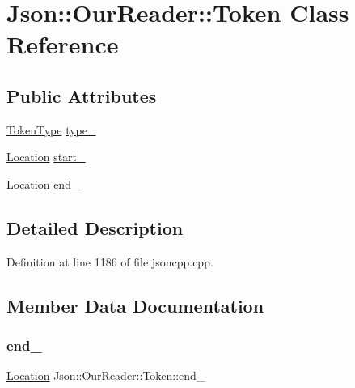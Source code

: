 \hypertarget{class_json_1_1_our_reader_1_1_token}{}\section{Json\+:\+:Our\+Reader\+:\+:Token Class Reference}
\label{class_json_1_1_our_reader_1_1_token}
\subsection*{Public Attributes}
\begin{DoxyCompactItemize}
\item 
\hyperlink{class_json_1_1_our_reader_a15116f7276ddf1e7a2cc3cbefa884dcc}{Token\+Type} \hyperlink{class_json_1_1_our_reader_1_1_token_abe7d858530396fa7e1293f7a579880ed}{type\+\_\+}
\item 
\hyperlink{class_json_1_1_our_reader_a1bdc7bbc52ba87cae6b19746f2ee0189}{Location} \hyperlink{class_json_1_1_our_reader_1_1_token_aedf68bb00eaaa9d3c22b9825999602ac}{start\+\_\+}
\item 
\hyperlink{class_json_1_1_our_reader_a1bdc7bbc52ba87cae6b19746f2ee0189}{Location} \hyperlink{class_json_1_1_our_reader_1_1_token_a67d2071638add857528579ae3791eccc}{end\+\_\+}
\end{DoxyCompactItemize}


\subsection{Detailed Description}


Definition at line 1186 of file jsoncpp.\+cpp.



\subsection{Member Data Documentation}
\hypertarget{class_json_1_1_our_reader_1_1_token_a67d2071638add857528579ae3791eccc}{}\label{class_json_1_1_our_reader_1_1_token_a67d2071638add857528579ae3791eccc} 
\subsubsection{\texorpdfstring{end\+\_\+}{end\_}}
{\footnotesize\ttfamily \hyperlink{class_json_1_1_our_reader_a1bdc7bbc52ba87cae6b19746f2ee0189}{Location} Json\+::\+Our\+Reader\+::\+Token\+::end\+\_\+}



